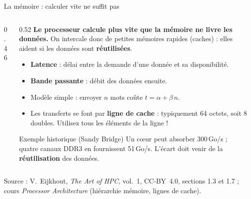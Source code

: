 \documentclass[8pt,aspectratio=169]{beamer}
\newcommand{\src}[1]{\vfill{\tiny\color{gray}Source : #1\par}}
\newcommand{\eij}{V.~Eijkhout, \emph{The Art of HPC}, vol.~1, CC-BY~4.0}
\begin{document}
\begin{frame}{La mémoire : calculer vite ne suffit pas}
\begin{columns}[T]
\begin{column}{0.46\textwidth}
\centering
{}
\end{column}
\begin{column}{0.52\textwidth}
\textbf{Le processeur calcule plus vite que la mémoire ne livre les données.} On intercale donc de petites mémoires rapides (caches) : elles aident si les données sont \textbf{réutilisées}.

\medskip
\begin{itemize}
\item \textbf{Latence} : délai entre la demande d'une donnée et sa disponibilité.
\item \textbf{Bande passante} : débit des données ensuite.
\item Modèle simple : envoyer $n$ mots coûte $t = \alpha + \beta\, n$.
\item Les transferts se font par \textbf{ligne de cache} : typiquement 64 octets, soit 8 doubles. Utilisez tous les éléments de la ligne !
\end{itemize}

\medskip
\begin{alertblock}{Exemple historique (Sandy Bridge)}
Un cœur peut absorber 300\,Go/s ; quatre canaux DDR3 en fournissent 51\,Go/s. L'écart doit venir de la \textbf{réutilisation} des données.
\end{alertblock}
\end{column}
\end{columns}
\src{\eij{}, sections 1.3 et 1.7 ; cours \emph{Processor Architecture} (hiérarchie mémoire, lignes de cache).}
\end{frame}
\end{document}
